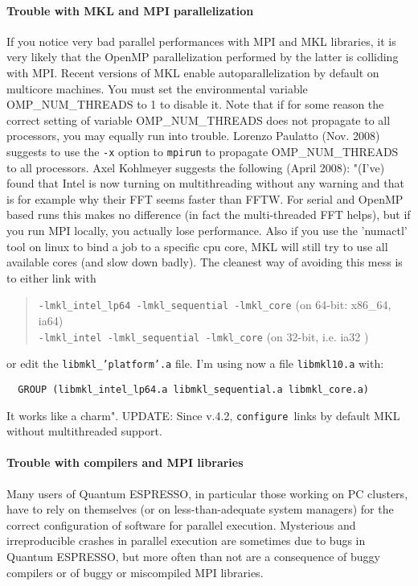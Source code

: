 \documentclass[12pt,a4paper]{article}
\def\qe{{\sc Quantum ESPRESSO}}
\def\configure{\texttt{configure}}
\begin{document}
\paragraph{Trouble with MKL and MPI parallelization}
If you notice very bad parallel performances with MPI and MKL libraries, 
it is very likely that the OpenMP parallelization performed by the latter 
is colliding with MPI. Recent versions of MKL enable autoparallelization
by default on multicore machines.  You must set the environmental variable
OMP\_NUM\_THREADS to 1 to disable it. 
Note that if for some reason the correct setting  of variable
OMP\_NUM\_THREADS  
does not propagate to all processors, you may equally run into trouble. 
Lorenzo Paulatto (Nov. 2008) suggests to use the \texttt{-x} option to \texttt{mpirun} to 
propagate OMP\_NUM\_THREADS to all processors.
Axel Kohlmeyer suggests the following (April 2008): 
"(I've) found that Intel is now turning on multithreading without any
warning and that is for example why their FFT seems faster than
FFTW. For serial and OpenMP based runs this makes no difference (in
fact the multi-threaded FFT helps), but if you run MPI locally, you
actually lose performance. Also if you use the 'numactl' tool on linux
to bind a job to a specific cpu core, MKL will still try to use all
available cores (and slow down badly). The cleanest way of avoiding
this mess is to either link with
\begin{quote}
\texttt{-lmkl\_intel\_lp64 -lmkl\_sequential -lmkl\_core} (on 64-bit: 
x86\_64, ia64)\\
\texttt{-lmkl\_intel -lmkl\_sequential -lmkl\_core} (on 32-bit, i.e. ia32 )
\end{quote}
or edit the \texttt{libmkl\_'platform'.a} file. I'm using now a file 
\texttt{libmkl10.a} with:
\begin{verbatim}
  GROUP (libmkl_intel_lp64.a libmkl_sequential.a libmkl_core.a)
\end{verbatim}
It works like a charm". UPDATE: Since v.4.2, \configure\ links by
default MKL without multithreaded support.

\paragraph{Trouble with compilers and MPI libraries}
Many users of \qe, in particular those working on PC clusters,
have to rely on themselves (or on less-than-adequate system managers) for 
the correct configuration of software for parallel execution. Mysterious and
irreproducible crashes in parallel execution are sometimes due to bugs
in \qe, but more often than not are a consequence of buggy
compilers or of buggy or miscompiled MPI libraries.
\end{document}
